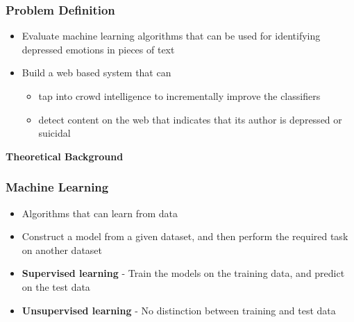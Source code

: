 \documentclass{beamer}
\begin{document}
    \begin{frame}
        \frametitle{Problem Definition}
        \begin{itemize}
            \item{Evaluate machine learning algorithms that can be used for identifying depressed emotions in pieces of text}
            \item{
            Build a web based system that can
            \begin{itemize}
                \item{tap into crowd intelligence to incrementally improve the classifiers}
                \item{detect content on the web that indicates that its author is depressed or suicidal}
            \end{itemize}
            }
        \end{itemize}
    \end{frame}
    
    \begin{frame}
        \begin{center}
            \textbf{Theoretical Background}
        \end{center}
    \end{frame}
    
    \begin{frame}
        \frametitle{Machine Learning}
        \begin{itemize}
            \item{Algorithms that can learn from data}
            \item{Construct a model from a given dataset, and then perform the required task on another dataset}
            \item{\textbf{Supervised learning} - Train the models on the training data, and predict on the test data}
            \item{\textbf{Unsupervised learning} - No distinction between training and test data}
        \end{itemize}
    \end{frame}
    
\end{document}
